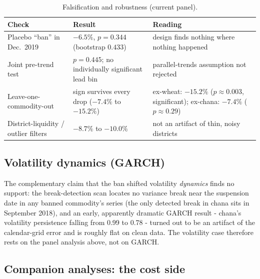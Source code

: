 \documentclass[11pt]{article}
\begin{document}
\begin{table}[htbp]
\centering\small
\caption{Falsification and robustness (current panel).}
\label{tab:falsification}
\begin{tabular}{p{5.2cm} p{4.2cm} p{4.2cm}}
\toprule
Check & Result & Reading \\
\midrule
Placebo ``ban'' in Dec.\ 2019 & $-6.5\%$, $p=0.344$ (bootstrap $0.433$) & design finds nothing where nothing happened \\
Joint pre-trend test & $p=0.445$; no individually significant lead bin & parallel-trends assumption not rejected \\
Leave-one-commodity-out & sign survives every drop ($-7.4\%$ to $-15.2\%$) & ex-wheat: $-15.2\%$ ($p\approx0.003$, significant); ex-chana: $-7.4\%$ ($p\approx0.29$) \\
District-liquidity / outlier filters & $-8.7\%$ to $-10.0\%$ & not an artifact of thin, noisy districts \\
\bottomrule
\end{tabular}
\end{table}

\subsection{Volatility dynamics (GARCH)}
The complementary claim that the ban shifted volatility \emph{dynamics} finds no support:
the break-detection scan locates no variance break near the suspension date in any
banned commodity's series (the only detected break in chana sits in September 2018), and
an early, apparently dramatic GARCH result - chana's volatility persistence falling
from 0.99 to 0.78 - turned out to be an artifact of the calendar-grid error and is
roughly flat on clean data. The volatility case therefore rests on the panel analysis
above, not on GARCH.

\subsection{Companion analyses: the cost side}
\label{sec:results-companions}
\end{document}
